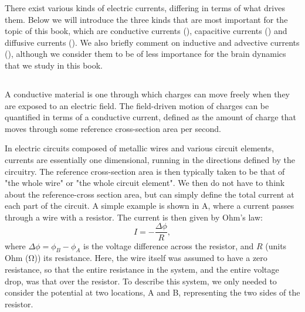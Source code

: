 There exist various kinds of electric currents, differing in terms of what drives them. Below we will introduce the three kinds that are most important for the topic of this book, which are conductive currents (),  capacitive currents () and diffusive currents (). We also briefly comment on inductive and advective currents (), although we consider them to be of less importance for the brain dynamics that we study in this book. 


\subsection{}
\label{sec:Basics:ConductiveCurrent}
A conductive material  is one through which charges can move freely when they are exposed to an electric field. The field-driven motion of charges can be quantified in terms of a conductive current, defined as the amount of charge that moves through some reference cross-section area per second.

In electric circuits composed of metallic wires and various circuit elements, currents are essentially one dimensional, running in the directions defined by the circuitry. The reference cross-section area is then typically taken to be that of "the whole wire" or "the whole circuit element". We then do not have to think about the reference-cross section area, but can simply define the total current at each part of the circuit. A simple example is shown in A, where a current passes through a wire with a resistor. The current is then given by Ohm's law:
\begin{equation}
I = - \frac{\Delta \phi}{R},
\label{eq:Basics:Ohm_R}
\end{equation}
where $\Delta \phi = \phi_B-\phi_A$ is the voltage difference across the resistor, and $R$ (units Ohm (\si{\ohm})) its resistance. Here, the wire itself was assumed to have a zero resistance, so that the entire resistance in the system, and the entire voltage drop, was that over the resistor. To describe this system, we only needed to consider the potential at two locations, A and B, representing the two sides of the resistor.

